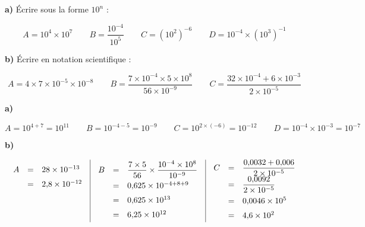 \begin{exo}
	\textbf{a)} Écrire sous la forme $10^n$ :

	\[
		A = 10^4 \times 10^7 \qquad B = \frac{10^{-4}}{10^5} \qquad C = \left( 10^2 \right)^{-6} \qquad D = 10^{-4} \times \left( 10^3 \right)^{-1}
	\]

	\textbf{b)} Écrire en notation scientifique :

	\[
		A = 4 \times 7 \times 10^{-5} \times 10^{-8} \qquad B = \frac{7 \times 10^{-4} \times 5 \times 10^8}{56 \times 10^{-9}} \qquad C = \frac{32 \times 10^{-4} + 6 \times 10^{-3}}{2 \times 10^{-5}}
	\]

	\begin{correction}

		\textbf{a)}

		\[
			A = 10^{4+7} = 10^{11} \qquad B = 10^{-4-5} = 10^{-9} \qquad C = 10^{2 \times (-6)} = 10^{-12} \qquad D = 10^{-4} \times 10^{-3} = 10^{-7}
		\]

		\textbf{b)}

		\[
			\begin{array}{r|r|r}
				\def\arraystretch{1.5} %
				\begin{array}{rcl}
					A & = & 28 \times 10^{-13}    \\
					  & = & 2{,}8 \times 10^{-12} \\
					  &   &                       \\
					  &   &                       \\
				\end{array}%
				 & %
				\def\arraystretch{1.5}%
				\begin{array}{rcl}
					B & = & \dfrac{7 \times 5}{56} \times \dfrac{10^{-4} \times 10^8}{10^{-9}} \\
					  & = & 0{,}625 \times 10^{-4+8+9}                                         \\
					  & = & 0{,}625 \times 10^{13}                                             \\
					  & = & 6{,}25 \times 10^{12}                                              \\
				\end{array} %
				 & %
				\def\arraystretch{1.5}%
				\begin{array}{rcl}
					C & = & \dfrac{0{,}0032 + 0{,}006}{2 \times 10^{-5}} \\
					  & = & \dfrac{0{,}0092}{2 \times 10^{-5}}           \\
					  & = & 0{,}0046 \times 10^5                         \\
					  & = & 4{,}6 \times 10^2                            \\
				\end{array}
			\end{array}
		\]

	\end{correction}
\end{exo}

